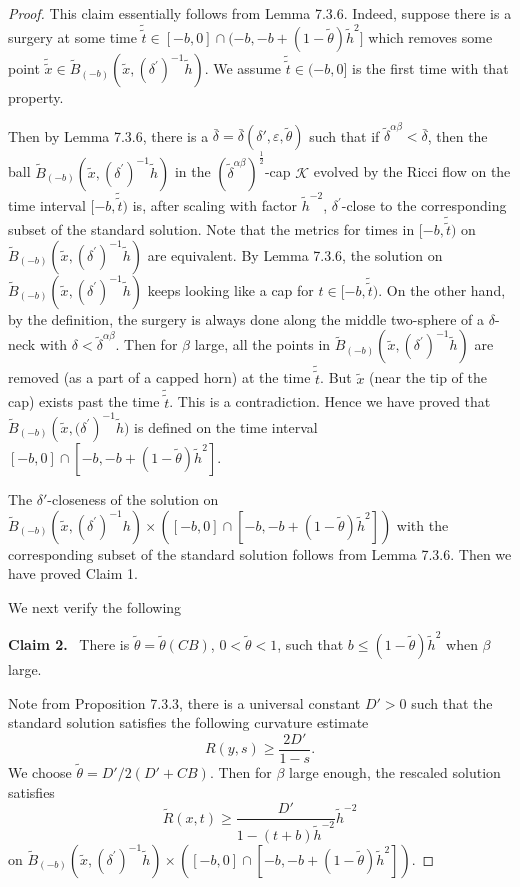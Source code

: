 \begin{proof}
\medskip
This claim essentially follows from Lemma 7.3.6. Indeed, suppose
there is a surgery at some time $\tilde{\tilde{t}}\in
[-b,0]\cap(-b,-b+(1-\tilde{\theta})\tilde{h}^{2}]$ which removes
some point  $\tilde{\tilde{x}}\in \widetilde
B_{(-b)}(\tilde{x},{(\delta^{\prime})}^{-1}\tilde{h})$. We assume
$\tilde{\tilde{t}}\in (-b,0]$ is the first time with that
property.

Then by Lemma 7.3.6, there is a
$\bar{\delta}=\bar{\delta}(\delta',\varepsilon,\tilde{\theta})$
such that if $\widetilde{\delta}^{\alpha\beta}<\bar{\delta}$, then
the ball
$\widetilde{B}_{(-b)}(\tilde{x},{(\delta^{\prime})}^{-1}\tilde{h})$
in the ${(\widetilde{\delta}^{\alpha\beta})}^{\frac{1}{2}}$-cap
$\mathcal{K}$ evolved by the Ricci flow  on the time interval
$[-b,\tilde{\tilde{t}})$ is, after scaling with factor
$\tilde{h}^{-2}$, ${\delta}^{\prime}$-close to the corresponding
subset of the standard solution. Note that the metrics for times
in $[-b,\tilde{\tilde{t}})$ on $\widetilde
B_{(-b)}(\tilde{x},{(\delta^{\prime})}^{-1}\tilde{h})$  are
equivalent. By Lemma 7.3.6, the solution on $\widetilde
B_{(-b)}(\tilde{x},{(\delta^{\prime})}^{-1}\tilde{h})$ keeps
looking like a cap for $t\in [-b,\tilde{\tilde{t}})$. On the other
hand, by the definition, the surgery is always done along the
middle two-sphere of a $\delta$-neck with $\delta <
\widetilde{\delta}^{\alpha\beta}$. Then for $\beta$ large, all the
points in $\widetilde
B_{(-b)}(\tilde{x},{(\delta^{\prime})}^{-1}\tilde{h})$ are removed
(as a part of a capped horn) at the time $\tilde{\tilde{t}}$. But
$\tilde{x}$ (near the tip of the cap) exists past the time
$\tilde{\tilde{t}}$. This is a contradiction. Hence we have proved
that
$\widetilde{B}_{(-b)}(\tilde{x},{(\delta^{\prime}})^{-1}\tilde{h})$
is defined on the time interval
$[-b,0]\cap[-b,-b+(1-\tilde{\theta})\tilde{h}^{2}]$.

The $\delta'$-closeness of the solution on $\widetilde{B}_{(-b)}
(\tilde{x},{(\delta^{\prime})}^{-1}h)\times ([-b,0]\cap[-b,
-b+(1-\tilde{\theta})\tilde{h}^{2}])$ with the corresponding
subset of the standard solution follows from Lemma 7.3.6. Then we
have proved Claim 1.

\smallskip
We next verify the following

\medskip
{\bf Claim 2.} \ There is $\tilde{\theta}=\tilde{\theta}(CB)$,
$0<\tilde{\theta}<1$, such that
$b\leq(1-\tilde{\theta})\tilde{h}^{2}$ when $\beta$ large.

\medskip
Note from Proposition 7.3.3, there is a universal constant $D'>0$
such that the standard solution satisfies the following curvature
estimate
$$
R(y,s) \geq \frac{2D'}{1-s}.
$$
We choose $\tilde{\theta}= {D'}/{2(D'+CB)}$. Then for $\beta$
large enough, the rescaled solution satisfies \begin{equation}
\widetilde{R}(x,t)\geq
\frac{D'}{1-(t+b)\tilde{h}^{-2}}\tilde{h}^{-2} %
\end{equation} on
$\widetilde{B}_{(-b)}(\tilde{x},{(\delta^{\prime})}^{-1}\tilde{h})\times
([-b,0]\cap[-b,-b+(1-\tilde{\theta})\tilde{h}^{2}])$.


\end{proof}
